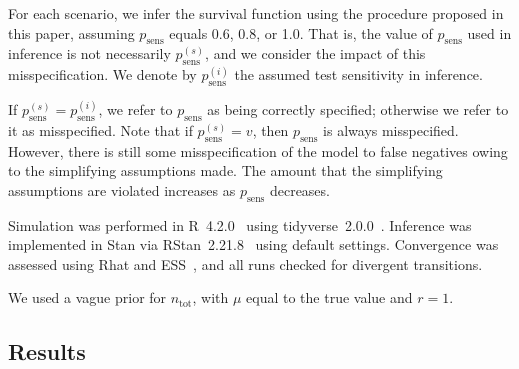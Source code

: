 \documentclass[12pt]{article}
\newcommand{\psens}{p_\text{sens}}
\newcommand{\psenss}{p_\text{sens}^{(s)}}
\newcommand{\psensi}{p_\text{sens}^{(i)}}
\newcommand{\ntot}{n_\text{tot}}
\begin{document}
For each scenario, we infer the survival function using the procedure proposed in this paper, assuming $\psens$ equals 0.6, 0.8, or 1.0.
That is, the value of $\psens$ used in inference is not necessarily $\psenss$, and we consider the impact of this misspecification.
We denote by $\psensi$ the assumed test sensitivity in inference.

If $\psenss = \psensi$, we refer to $\psens$ as being correctly specified; otherwise we refer to it as misspecified.
Note that if $\psenss = v$, then $\psens$ is always misspecified.
However, there is still some misspecification of the model to false negatives owing to the simplifying assumptions made.
The amount that the simplifying assumptions are violated increases as $\psens$ decreases.

Simulation was performed in R~4.2.0~\citep{R-4-2-0} using tidyverse~2.0.0~\citep{tidyverse}.
Inference was implemented in Stan via RStan~2.21.8~\citep{rstan2-21-8} using default settings.
Convergence was assessed using Rhat and ESS~\cite{vehtariRhat}, and all runs checked for divergent transitions.

We used a vague prior for $\ntot$, with $\mu$ equal to the true value and $r=1$.

\subsection{Results}
\end{document}
